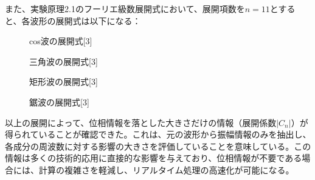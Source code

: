 \documentclass{article}
\begin{document}
\begin{spacing}{1.2}
    また、実験原理2.1のフーリエ級数展開式において、展開項数を$n=11$とすると、各波形の展開式は以下になる：
    \begin{figure}[htbp]
        \centering
        \begin{minipage}[b]{0.49\textwidth} %
          \centering
          \caption{cos波の展開式[3]}
        \end{minipage}%
        \begin{minipage}[b]{0.49\textwidth}
          \centering
          \caption{三角波の展開式[3]}
        \end{minipage}
    \end{figure}
    \begin{figure}[htbp]
        \centering
        \begin{minipage}[b]{0.49\textwidth} %
          \centering
          \caption{矩形波の展開式[3]}
        \end{minipage}%
        \begin{minipage}[b]{0.49\textwidth}
          \centering
          \caption{鋸波の展開式[3]}
        \end{minipage}
    \end{figure}
    \FloatBarrier
    以上の展開によって、位相情報を落とした大きさだけの情報（展開係数$|C_n|$）が得られていることが確認できた。これは、元の波形から振幅情報のみを抽出し、各成分の周波数に対する影響の大きさを評価していることを意味している。この情報は多くの技術的応用に直接的な影響を与えており、位相情報が不要である場合には、計算の複雑さを軽減し、リアルタイム処理の高速化が可能になる。
\end{spacing}
\end{document}
